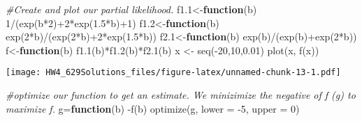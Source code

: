 \documentclass[
]{article}
\newenvironment{Shaded}{\begin{snugshade}}{\end{snugshade}}
\newcommand{\AttributeTok}[1]{\textcolor[rgb]{0.77,0.63,0.00}{#1}}
\newcommand{\CommentTok}[1]{\textcolor[rgb]{0.56,0.35,0.01}{\textit{#1}}}
\newcommand{\ControlFlowTok}[1]{\textcolor[rgb]{0.13,0.29,0.53}{\textbf{#1}}}
\newcommand{\DecValTok}[1]{\textcolor[rgb]{0.00,0.00,0.81}{#1}}
\newcommand{\FloatTok}[1]{\textcolor[rgb]{0.00,0.00,0.81}{#1}}
\newcommand{\FunctionTok}[1]{\textcolor[rgb]{0.00,0.00,0.00}{#1}}
\newcommand{\NormalTok}[1]{#1}
\newcommand{\OtherTok}[1]{\textcolor[rgb]{0.56,0.35,0.01}{#1}}
\newcommand{\SpecialCharTok}[1]{\textcolor[rgb]{0.00,0.00,0.00}{#1}}
\begin{document}
\begin{Shaded}
\begin{Highlighting}[]
\CommentTok{\#Create and plot our partial likelihood. }
\NormalTok{f1}\FloatTok{.1}\OtherTok{\textless{}{-}}\ControlFlowTok{function}\NormalTok{(b) }\DecValTok{1}\SpecialCharTok{/}\NormalTok{(}\FunctionTok{exp}\NormalTok{(b}\SpecialCharTok{*}\DecValTok{2}\NormalTok{)}\SpecialCharTok{+}\DecValTok{2}\SpecialCharTok{*}\FunctionTok{exp}\NormalTok{(}\FloatTok{1.5}\SpecialCharTok{*}\NormalTok{b)}\SpecialCharTok{+}\DecValTok{1}\NormalTok{)}
\NormalTok{f1}\FloatTok{.2}\OtherTok{\textless{}{-}}\ControlFlowTok{function}\NormalTok{(b) }\FunctionTok{exp}\NormalTok{(}\DecValTok{2}\SpecialCharTok{*}\NormalTok{b)}\SpecialCharTok{/}\NormalTok{(}\FunctionTok{exp}\NormalTok{(}\DecValTok{2}\SpecialCharTok{*}\NormalTok{b)}\SpecialCharTok{+}\DecValTok{2}\SpecialCharTok{*}\FunctionTok{exp}\NormalTok{(}\FloatTok{1.5}\SpecialCharTok{*}\NormalTok{b))}
\NormalTok{f2}\FloatTok{.1}\OtherTok{\textless{}{-}}\ControlFlowTok{function}\NormalTok{(b) }\FunctionTok{exp}\NormalTok{(b)}\SpecialCharTok{/}\NormalTok{(}\FunctionTok{exp}\NormalTok{(b)}\SpecialCharTok{+}\FunctionTok{exp}\NormalTok{(}\DecValTok{2}\SpecialCharTok{*}\NormalTok{b))}
\NormalTok{f}\OtherTok{\textless{}{-}}\ControlFlowTok{function}\NormalTok{(b) }\FunctionTok{f1.1}\NormalTok{(b)}\SpecialCharTok{*}\FunctionTok{f1.2}\NormalTok{(b)}\SpecialCharTok{*}\FunctionTok{f2.1}\NormalTok{(b)}
\NormalTok{x }\OtherTok{\textless{}{-}} \FunctionTok{seq}\NormalTok{(}\SpecialCharTok{{-}}\DecValTok{20}\NormalTok{,}\DecValTok{10}\NormalTok{,}\FloatTok{0.01}\NormalTok{)}
\FunctionTok{plot}\NormalTok{(x, }\FunctionTok{f}\NormalTok{(x))   }
\end{Highlighting}
\end{Shaded}

\texttt{[image: HW4\_629Solutions\_files/figure-latex/unnamed-chunk-13-1.pdf]}

\begin{Shaded}
\begin{Highlighting}[]
\CommentTok{\#optimize our function to get an estimate. We minizimize the negative of f (g) to maximize f. }
\NormalTok{g}\OtherTok{=}\ControlFlowTok{function}\NormalTok{(b) }\SpecialCharTok{{-}}\FunctionTok{f}\NormalTok{(b) }
\FunctionTok{optimize}\NormalTok{(g, }\AttributeTok{lower =} \SpecialCharTok{{-}}\DecValTok{5}\NormalTok{, }\AttributeTok{upper =} \DecValTok{0}\NormalTok{)}
\end{Highlighting}
\end{Shaded}
\end{document}
